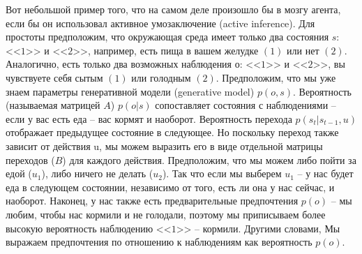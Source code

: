 \documentclass[12pt]{article}
\begin{document}

Вот небольшой пример того, что на самом деле произошло бы в мозгу агента, если бы он использовал активное умозаключение (active inference). Для простоты предположим, что окружающая среда имеет только два состояния $s$: <<$1$>> и <<$2$>>, например, есть пища в вашем желудке $(1)$ или нет $(2)$. Аналогично, есть только два возможных наблюдения $о$: <<$1$>> и <<$2$>>, вы чувствуете себя сытым $(1)$ или голодным $(2)$. Предположим, что мы уже знаем параметры генеративной модели (generative model) $p(o,s)$. Вероятность (называемая матрицей $A$) $p(o|s)$ сопоставляет состояния с наблюдениями -- если у вас есть еда -- вас кормят и наоборот. Вероятность перехода $p(s_t|s_{t-1},u)$ отображает предыдущее состояние в следующее. Но поскольку переход также зависит от действия u, мы можем выразить его в виде отдельной матрицы переходов ($B$) для каждого действия. Предположим, что мы можем либо пойти за едой ($u_1$), либо ничего не делать ($u_2$). Так что если мы выберем $u_1$ -- у нас будет еда в следующем состоянии, независимо от того, есть ли она у нас сейчас, и наоборот. Наконец, у нас также есть предварительные предпочтения $p(o)$ -- мы любим, чтобы нас кормили и не голодали, поэтому мы приписываем более высокую вероятность наблюдению <<$1$>> -- кормили. Другими словами, Мы выражаем предпочтения по отношению к наблюдениям как вероятность $p(o)$.

\begin{figure}[h]
\end{figure}
\end{document}
